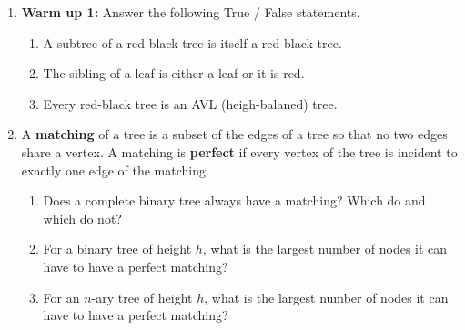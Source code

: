 \documentclass[a4paper,12pt]{article}
\begin{document}
\begin{enumerate}

\item \textbf{Warm up 1:} Answer the following True / False statements.
\begin{enumerate}
\item A subtree of a red-black tree is itself a red-black tree.
\item The sibling of a leaf is either a leaf or it is red.
\item Every red-black tree is an AVL (heigh-balaned) tree.
\end{enumerate}

\vfill
\item A \textbf{matching} of a tree is a subset of the edges of a tree so that no two edges share a vertex. A matching is \textbf{perfect} if every vertex of the tree is incident to exactly one edge of the matching.
\begin{enumerate}
\item Does a complete binary tree always have a matching? Which do and which do not?
\item For a binary tree of height $h$, what is the largest number of nodes it can have to have a perfect matching?
\item For an $n$-ary tree of height $h$, what is the largest number of nodes it can have to have a perfect matching?
\end{enumerate}


\end{enumerate}
\end{document}
